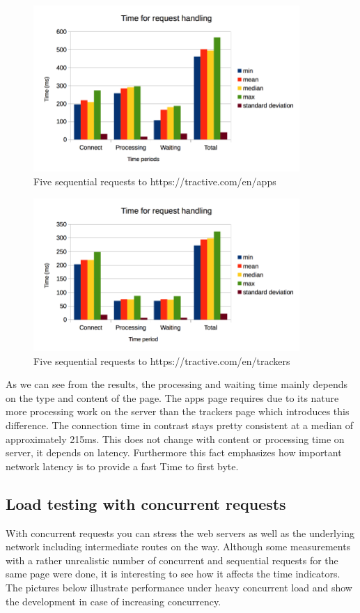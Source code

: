 \begin{figure}[h]
	\centering
		\includegraphics[width=0.9\textwidth]{imgs/seq_req_apps.png}
	\caption{Five sequential requests to https://tractive.com/en/apps}
\end{figure}

\begin{figure}[h]
	\centering
		\includegraphics[width=0.9\textwidth]{imgs/seq_req_trackers.png}
	\caption{Five sequential requests to https://tractive.com/en/trackers}
\end{figure}

As we can see from the results, the processing and waiting time mainly depends on the type and content of the page. The apps page requires due to its nature more processing work on the server than the trackers page which introduces this difference. The connection time in contrast stays pretty consistent at a median of approximately 215ms. This does not change with content or processing time on server, it depends on latency. Furthermore this fact emphasizes how important network latency is to provide a fast Time to first byte.

\subsection{Load testing with concurrent requests}
With concurrent requests you can stress the web servers as well as the underlying network including intermediate routes on the way. Although some measurements with a rather unrealistic number of concurrent and sequential requests for the same page were done, it is interesting to see how it affects the time indicators. The pictures below illustrate performance under heavy concurrent load and show the development in case of increasing concurrency.

